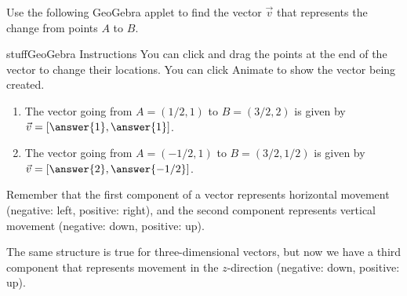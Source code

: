 \documentclass{ximera}
\begin{document}
\begin{problem}
    Use the following GeoGebra applet to find the vector $\vec{v}$ that represents the change from points $A$ to $B$.

    \begin{expandable}{stuff}{GeoGebra Instructions}
        You can click and drag the points at the end of the vector to change their locations. You can click Animate to show the vector being created. 
    \end{expandable}

    \begin{center}
    \end{center}

    \begin{enumerate}
        \item The vector going from $A=(1/2,1)$ to $B=(3/2,2)$ is given by $\vec{v}=[\answer{1},\answer{1}]$.
        \item The vector going from $A=(-1/2,1)$ to $B=(3/2,1/2)$ is given by $\vec{v}=[\answer{2},\answer{-1/2}]$.
    \end{enumerate}
    \begin{feedback}
        Remember that the first component of a vector represents horizontal movement (negative: left, positive: right), and the second component represents vertical movement (negative: down, positive: up).
    \end{feedback}
\end{problem}

The same structure is true for three-dimensional vectors, but now we have a third component that represents movement in the $z$-direction (negative: down, positive: up).
\end{document}
